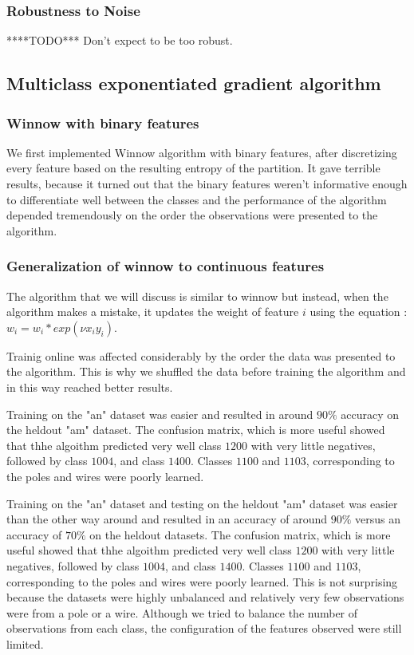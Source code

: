 \documentclass[10pt,a4paper]{article}
\begin{document}
\subsubsection{Robustness to Noise}
****TODO*** Don't expect to be too robust.
\subsection{Multiclass exponentiated gradient algorithm}

\subsubsection{Winnow with binary features}
We first implemented Winnow algorithm with binary features, after discretizing every feature based on the resulting entropy of the partition. It gave terrible results, because it turned out that the binary features weren't informative enough to differentiate well between the classes and the performance of the algorithm depended tremendously on the order the observations were presented to the algorithm. 

\subsubsection{Generalization of winnow to continuous features}

The algorithm that we will discuss is similar to winnow but instead, when the algorithm makes a mistake, it updates the weight of feature $i$ using the equation : $w_i = w_i*exp(\nu x_i y_i)$. 

Trainig online was affected considerably by the order the data was presented to the algorithm. This is why we shuffled the data before training the algorithm and in this way reached better results.

Training on the "an" dataset was easier and resulted in around $90\%$ accuracy on the heldout "am" dataset. The confusion matrix, which is more useful showed that thhe algoithm predicted very well class $1200$ with very little negatives, followed by class $1004$, and class $1400$. Classes $1100$ and $1103$, corresponding to the poles and wires were poorly learned.

Training on the "an" dataset and testing on the heldout "am" dataset was easier than the other way around and resulted in an accuracy of around $90\%$ versus an accuracy of $70\%$ on the heldout datasets. The confusion matrix, which is more useful showed that thhe algoithm predicted very well class $1200$ with very little negatives, followed by class $1004$, and class $1400$. Classes $1100$ and $1103$, corresponding to the poles and wires were poorly learned. This is not surprising because the datasets were highly unbalanced and relatively very few observations were from a pole or a wire. Although we tried to balance the number of observations from each class, the configuration of the features observed were still limited.
\end{document}

